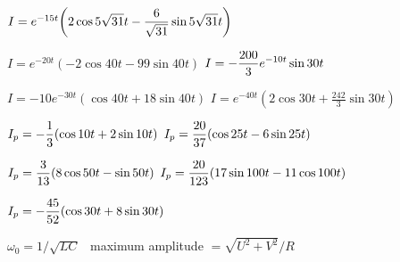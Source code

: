 \medskip

$I=e^{-15t}\displaystyle{\left(2\cos5\sqrt{31}t-
\frac{6}{\sqrt{31}}\sin5\sqrt{31}t\right)}$

 $I=e^{-20t}(-2\cos40t-99\sin40t)$
 $I=-\displaystyle\frac{200}{3}e^{-10t}\sin30t$

 $I=-10e^{-30t}(\cos40t+18\sin40t)$
 $I=e^{-40t}\left(2\cos30t+\frac{242}{3}\sin30t\right)$

 $I_{p}=\displaystyle-\frac{1}{3}(\cos10t+2\sin10t)$
 $I_{p}=\displaystyle\frac{20}{37}(\cos25t-6\sin25t)$

 $I_{p}=\displaystyle\frac{3}{13}(8\cos50t-\sin50t)$
 $I_{p}=\displaystyle\frac{20}{123}(17\sin100t-11\cos100t)$

 $I_{p}=-\displaystyle\frac{45}{52}(\cos30t+8\sin30t)$

 $\omega_{0}=1/\sqrt{LC}$  \, maximum amplitude $=\sqrt{U^{2}+V^{2}}/R$

